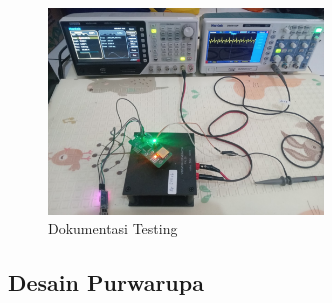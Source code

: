 \documentclass{book} %
\begin{document}
	\newpage
	\begin{figure}[!ht]
		\centering
		\includegraphics[width=0.65\textwidth]{images/testactual.jpg}
		\caption{Dokumentasi Testing}
	\end{figure}
	
	\subsection{Desain Purwarupa}
	
\end{document}
